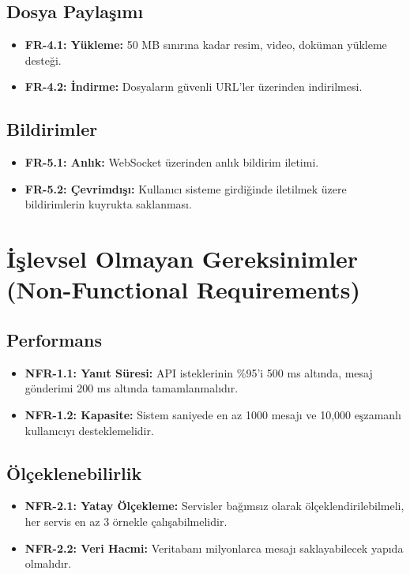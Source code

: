 \subsection{Dosya Paylaşımı}
\begin{itemize}
    \item \textbf{FR-4.1: Yükleme:} 50 MB sınırına kadar resim, video, doküman yükleme desteği.
    \item \textbf{FR-4.2: İndirme:} Dosyaların güvenli URL'ler üzerinden indirilmesi.
\end{itemize}

\subsection{Bildirimler}
\begin{itemize}
    \item \textbf{FR-5.1: Anlık:} WebSocket üzerinden anlık bildirim iletimi.
    \item \textbf{FR-5.2: Çevrimdışı:} Kullanıcı sisteme girdiğinde iletilmek üzere bildirimlerin kuyrukta saklanması.
\end{itemize}

\section{İşlevsel Olmayan Gereksinimler (Non-Functional Requirements)}

\subsection{Performans}
\begin{itemize}
    \item \textbf{NFR-1.1: Yanıt Süresi:} API isteklerinin \%95'i 500 ms altında, mesaj gönderimi 200 ms altında tamamlanmalıdır.
    \item \textbf{NFR-1.2: Kapasite:} Sistem saniyede en az 1000 mesajı ve 10,000 eşzamanlı kullanıcıyı desteklemelidir.
\end{itemize}

\subsection{Ölçeklenebilirlik}
\begin{itemize}
    \item \textbf{NFR-2.1: Yatay Ölçekleme:} Servisler bağımsız olarak ölçeklendirilebilmeli, her servis en az 3 örnekle çalışabilmelidir.
    \item \textbf{NFR-2.2: Veri Hacmi:} Veritabanı milyonlarca mesajı saklayabilecek yapıda olmalıdır.
\end{itemize}

